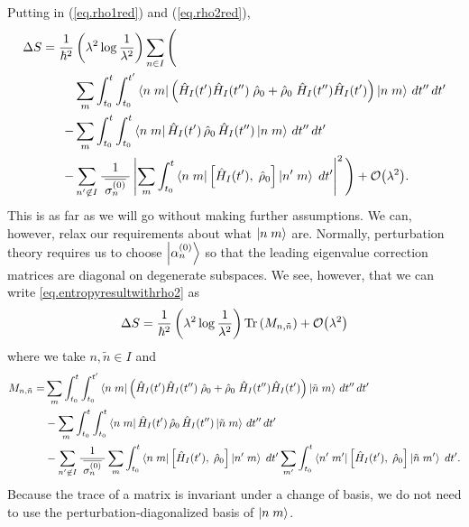 Putting in (\ref{eq.rho1red}) and (\ref{eq.rho2red}),
\begin{align}\label{eq.entropyresultwithrho2}
\Delta S = \frac{1}{\hbar^2}&\left(\lambda^2 \log\frac{1}{\lambda^2}\right)\sum_{n \in I} \Bigg( \\
& \sum_m\int_{t_0}^t \int_{t_0}^{t^\prime} \left\langle n\;m\right| \left( \hat{H}_I (t^\prime) \hat{H}_I(t^{\prime\prime}) \;\hat{\rho}_0 + \hat{\rho}_0\; \hat{H}_I (t^{\prime\prime}) \hat{H}_I(t^{\prime}) \right) \left|n\;m\right\rangle\,dt^{\prime\prime}\,dt^\prime \nonumber\\
-& \sum_m\int_{t_0}^t \int_{t_0}^{t} \left\langle n\;m\right|\hat{H}_I (t^\prime) \,\hat{\rho}_0\, \hat{H}_I (t^{\prime\prime})\left|n\;m\right\rangle\,dt^{\prime\prime}\,dt^\prime \nonumber\\
-& \sum_{n^\prime \not \in I} \frac{1}{\;\overline{\sigma_n^{(0)}}\;} \left|\sum_m\int_{t_0}^t \left\langle n\;m\right| \left[\hat{H}_I(t^\prime),\; \hat{\rho}_0 \right] \left|n^\prime\;m\right\rangle\;dt^\prime \right|^2
\Bigg) + \mathcal{O}{\left(\lambda^2\right)}. \nonumber
\end{align}
This is as far as we will go without making further assumptions. We can, however, relax our requirements about what \(\left|n\;m\right\rangle\) are. Normally, perturbation theory requires us to choose \(\left|\alpha_n^{(0)}\right\rangle\) so that the leading eigenvalue correction matrices are diagonal on degenerate subspaces. We see, however, that we can write \ref{eq.entropyresultwithrho2} as 
\[
\Delta S = \frac{1}{\hbar^2}\left(\lambda^2 \log\frac{1}{\lambda^2}\right)\operatorname{Tr}\left(M_{n,\tilde{n}}\right) + \mathcal{O}{\left(\lambda^2\right)}
\]
where we take \(n,\tilde{n} \in I\) and
\begin{align*}
M_{n,\tilde{n}} = &\sum_m\int_{t_0}^t \int_{t_0}^{t^\prime} \left\langle n\;m\right| \left( \hat{H}_I (t^\prime) \hat{H}_I(t^{\prime\prime}) \;\hat{\rho}_0 + \hat{\rho}_0\; \hat{H}_I (t^{\prime\prime}) \hat{H}_I(t^{\prime}) \right) \left|\tilde{n}\;m\right\rangle\,dt^{\prime\prime}\,dt^\prime \nonumber\\
&- \sum_m\int_{t_0}^t \int_{t_0}^{t} \left\langle n\;m\right|\hat{H}_I (t^\prime) \,\hat{\rho}_0\, \hat{H}_I (t^{\prime\prime})\left|\tilde{n}\;m\right\rangle\,dt^{\prime\prime}\,dt^\prime \nonumber\\
&- \sum_{n^\prime \not \in I} \frac{1}{\;\overline{\sigma_n^{(0)}}\;} \sum_m\int_{t_0}^t \left\langle n\;m\right| \left[\hat{H}_I(t^\prime),\; \hat{\rho}_0 \right] \left|n^\prime\;m\right\rangle\;dt^\prime \sum_{m^\prime}\int_{t_0}^t \left\langle n^\prime\;m^\prime\right| \left[\hat{H}_I(t^\prime),\; \hat{\rho}_0 \right] \left|\tilde{n}\;m^\prime\right\rangle\;dt^\prime.
\end{align*}
Because the trace of a matrix is invariant under a change of basis, we do not need to use the perturbation-diagonalized basis of \(\left|n\;m\right\rangle\).

